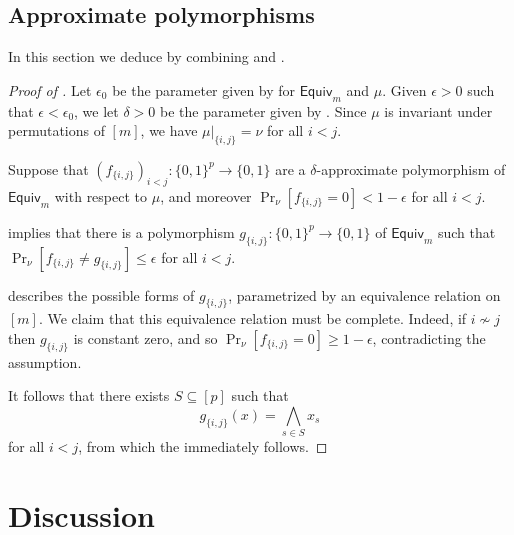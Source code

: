 \documentclass{article}
\providecommand{\Equiv}{\mathsf{Equiv}}
\theoremstyle{definition}
\theoremstyle{remark}
\begin{document}
\subsection{Approximate polymorphisms}
\label{sec:equivalence-approximate}

In this section we deduce  by combining  and .

\begin{proof}[Proof of ]
Let $\epsilon_0$ be the parameter given by  for $\Equiv_m$ and $\mu$.
Given $\epsilon > 0$ such that $\epsilon < \epsilon_0$, we let $\delta > 0$ be the parameter given by . Since $\mu$ is invariant under permutations of $[m]$, we have $\mu|_{\{i,j\}} = \nu$ for all $i < j$.

Suppose that $(f_{\{i,j\}})_{i < j} \colon \{0,1\}^p \to \{0,1\}$ are a $\delta$-approximate polymorphism of $\Equiv_m$ with respect to $\mu$, and moreover $\Pr_\nu[f_{\{i,j\}} = 0] < 1 - \epsilon$ for all $i < j$.

 implies that there is a polymorphism $g_{\{i,j\}}\colon \{0,1\}^p \to \{0,1\}$ of $\Equiv_m$ such that $\Pr_\nu[f_{\{i,j\}} \neq g_{\{i,j\}}] \leq \epsilon$ for all $i < j$.

 describes the possible forms of $g_{\{i,j\}}$, parametrized by an equivalence relation on $[m]$. We claim that this equivalence relation must be complete. Indeed, if $i\nsim j$ then $g_{\{i,j\}}$ is constant zero, and so $\Pr_\nu[f_{\{i,j\}} = 0] \ge 1 - \epsilon$, contradicting the assumption.

It follows that there exists $S \subseteq [p]$ such that
\[
 g_{\{i,j\}}(x) = \bigwedge_{s \in S} x_s
\]
for all $i < j$, from which the  immediately follows.
\end{proof}

\section{Discussion}
\label{sec:discussion}
\end{document}
